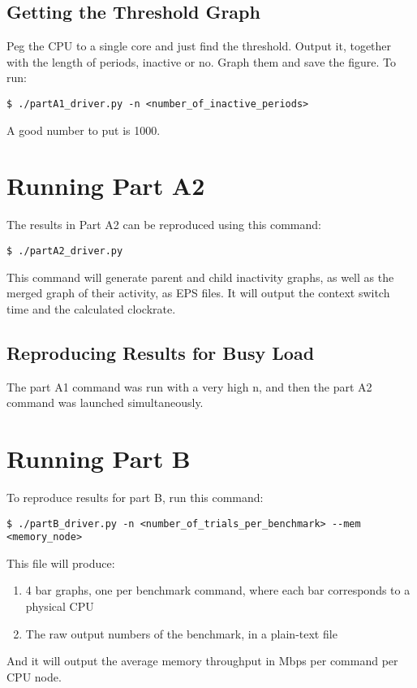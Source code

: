 \documentclass[a4paper, 12pt]{article}
\begin{document}
\begin{appendices}
\subsection{Getting the Threshold Graph}

Peg the CPU to a single core and just find the threshold. Output it, together with the length of periods, inactive or no. Graph them and save the figure. To run:

\begin{lstlisting}
$ ./partA1_driver.py -n <number_of_inactive_periods>
\end{lstlisting}

A good number to put is 1000.

\section{Running Part A2}

The results in Part A2 can be reproduced using this command:

\begin{lstlisting}
$ ./partA2_driver.py
\end{lstlisting}

This command will generate parent and child inactivity graphs, as well as the merged graph of their activity, as EPS files. It will output the context switch time and the calculated clockrate.

\subsection{Reproducing Results for Busy Load}

The part A1 command was run with a very high n, and then the part A2 command was launched simultaneously.

\section{Running Part B}

To reproduce results for part B, run this command:

\begin{lstlisting}
$ ./partB_driver.py -n <number_of_trials_per_benchmark> --mem <memory_node>
\end{lstlisting}

This file will produce:

\begin{enumerate}
\item	4 bar graphs, one per benchmark command, where each bar corresponds to a physical CPU
\item	The raw output numbers of the benchmark, in a plain-text file
\end{enumerate}

And it will output the average memory throughput in Mbps per command per CPU node.
\end{appendices}
\end{document}
